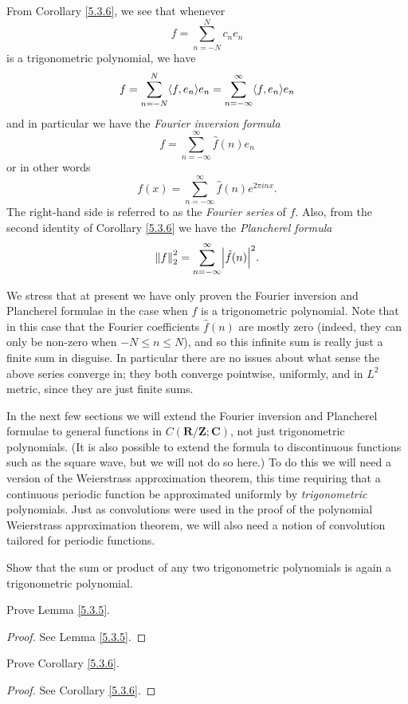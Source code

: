 \begin{additional corollary}\label{ac 5.3.1}
From Corollary \ref{5.3.6}, we see that whenever
\[
    f = \sum_{n = -N}^N c_n e_n
\]
is a trigonometric polynomial, we have
\[
    f = \sum_{n = -N}^N \inner*{f, e_n} e_n = \sum_{n = -\infty}^\infty \inner*{f, e_n} e_n
\]
and in particular we have the \emph{Fourier inversion formula}
\[
    f = \sum_{n = -\infty}^\infty \hat{f}(n) e_n
\]
or in other words
\[
    f(x) = \sum_{n = -\infty}^\infty \hat{f}(n) e^{2 \pi i n x}.
\]
The right-hand side is referred to as the \emph{Fourier series} of \(f\).
Also, from the second identity of Corollary \ref{5.3.6} we have the \emph{Plancherel formula}
\[
    \norm*{f}_2^2 = \sum_{n = -\infty}^\infty \abs*{\hat{f}(n)}^2.
\]
\end{additional corollary}

\begin{remark}\label{5.3.8}
    We stress that at present we have only proven the Fourier inversion and Plancherel formulae in the case when \(f\) is a trigonometric polynomial.
    Note that in this case that the Fourier coefficients \(\hat{f}(n)\) are mostly zero (indeed, they can only be non-zero when \(-N \leq n \leq N\)), and so this infinite sum is really just a finite sum in disguise.
    In particular there are no issues about what sense the above series converge in;
    they both converge pointwise, uniformly, and in \(L^2\) metric, since they are just finite sums.
\end{remark}

\begin{note}
    In the next few sections we will extend the Fourier inversion and Plancherel formulae to general functions in \(C(\mathbf{R} / \mathbf{Z} ; \mathbf{C})\), not just trigonometric polynomials.
    (It is also possible to extend the formula to discontinuous functions such as the square wave, but we will not do so here.)
    To do this we will need a version of the Weierstrass approximation theorem, this time requiring that a continuous periodic function be approximated uniformly by \emph{trigonometric} polynomials.
    Just as convolutions were used in the proof of the polynomial Weierstrass approximation theorem, we will also need a notion of convolution tailored for periodic functions.
\end{note}

\exercisesection

\begin{exercise}\label{ex 5.3.1}
    Show that the sum or product of any two trigonometric polynomials is again a trigonometric polynomial.
\end{exercise}

\begin{exercise}\label{ex 5.3.2}
    Prove Lemma \ref{5.3.5}.
\end{exercise}

\begin{proof}
    See Lemma \ref{5.3.5}.
\end{proof}

\begin{exercise}\label{ex 5.3.3}
    Prove Corollary \ref{5.3.6}.
\end{exercise}

\begin{proof}
    See Corollary \ref{5.3.6}.
\end{proof}